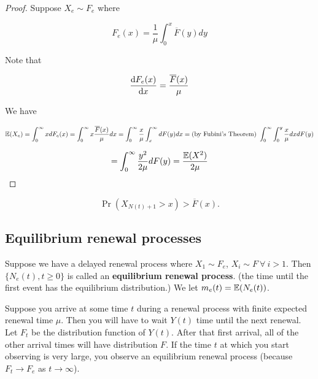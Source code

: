\begin{proof}

Suppose \(X_e \sim F_e\) where

\[
F_e(x) = \frac{1}{\mu} \int_0^x \overline{F}(y) dy 
\]

Note that

\[
\frac{\mathrm{d} F_e(x)}{\mathrm{d} x} = \frac{\overline{F}(x)}{\mu}
\]

We have

\[
\mathbb{E}(X_e) = \int_0^\infty x  dF_e(x) = \int_0^\infty x \frac{\overline{F}(x)}{\mu} dx = \int_0^\infty \frac{x}{\mu} \int_x^\infty dF(y) dx = \text{(by Fubini's Theorem) }  \int_0^\infty  \int_0^y \frac{x}{\mu}  dx dF(y)
\]

\[
=  \int_0^\infty  \frac{y^2}{2 \mu} dF(y) = \frac{\mathbb{E}(X^2)}{2 \mu}
\]


\end{proof}


\begin{proposition}

\[
\Pr(X_{N(t)+1} > x) > \overline{F}(x).
\]

\end{proposition}

\subsection{Equilibrium renewal processes}


\begin{definition}
Suppose we have a delayed renewal process where \(X_1\sim F_e\), \(X_i \sim F \ \forall \ i > 1\). Then \(\{N_e(t), t \geq 0 \}\) is called an \textbf{equilibrium renewal process}. (the time until the first event has the equilibrium distribution.) We let \(m_e(t) = \mathbb{E}(N_e(t))\).

\end{definition}

\begin{example}
Suppose you arrive at some time \(t\) during a renewal process with finite expected renewal time \(\mu\). Then you will have to wait \(Y(t)\) time until the next renewal. Let \(F_t\) be the distribution function of \(Y(t)\). After that first arrival, all of the other arrival times will have distribution \(F\). If the time \(t\) at which you start observing is very large, you observe an equilibrium renewal process (because \(F_t \to F_e\) as \(t \to \infty\)).

\end{example}

